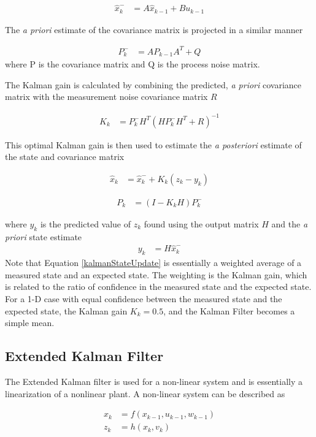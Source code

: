 \begin{align}
\hat{x}^-_k &= A\hat{x}_{k-1}+Bu_{k-1}
\end{align}

The \textit{a priori} estimate of the covariance matrix is projected in a similar manner

\begin{align}
P^-_k &= AP_{k-1}A^T+Q
\end{align}
where P is the covariance matrix and Q is the process noise matrix.

The Kalman gain is calculated by combining the predicted, \textit{a priori} covariance matrix with the measurement noise covariance matrix $R$

\begin{align}
K_k &=P^-_kH^T(HP^-_kH^T + R)^{-1}
\end{align}

This optimal Kalman gain is then used to estimate the \textit{a posteriori} estimate of the state and covariance matrix

\begin{align}
\label{kalmanStateUpdate}
\hat{x}_k &=\hat{x}^-_k+K_k(z_k-y_k)
\end{align}

\begin{align}
P_k &= (I-K_kH)P^-_k
\end{align}

where $y_k$ is the predicted value of $z_k$ found using the output matrix $H$ and the \textit{a priori} state estimate
\begin{align}
y_k &= H\hat{x}^-_k
\end{align}
Note that Equation \ref{kalmanStateUpdate} is essentially a weighted average of a measured state and an expected state. The weighting is the Kalman gain, which is related to the ratio of confidence in the measured state and the expected state. For a 1-D case with equal confidence between the measured state and the expected state, the Kalman gain $K_k = 0.5$, and the Kalman Filter becomes a simple mean.


\subsection*{Extended Kalman Filter}
\label{EKFTheory}
The Extended Kalman filter is used for a non-linear system and is essentially a linearization of a nonlinear plant. A non-linear system can be described as \cite{welch1995introduction}

\begin{align}
x_k &= f(x_{k-1},u_{k-1},w_{k-1})\\
z_k &= h(x_k,v_k)
\end{align}

